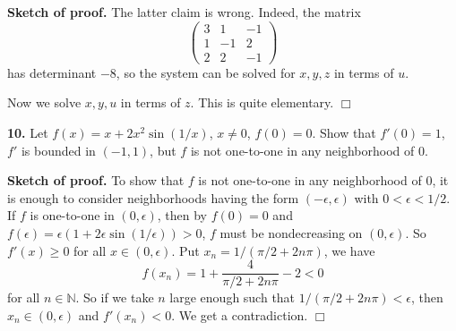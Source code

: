 \documentclass{article}
\begin{document}
    \textbf{Sketch of proof.} The latter claim is wrong. Indeed, the matrix
\[\begin{pmatrix}
3 & 1 & -1\\
1 & -1 & 2 \\
2 & 2 & -1
\end{pmatrix}\] has determinant $-8$, so the system can be solved for
$x,y,z$ in terms of $u$.

Now we solve $x,y,u$ in terms of $z$. This is quite elementary. $\Box$

    \textbf{10.} Let $f(x) = x+2x^2\sin(1/x)$, $x\ne 0$, $f(0) = 0$. Show
that $f'(0) = 1$, $f'$ is bounded in $(-1,1)$, but $f$ is not one-to-one
in any neighborhood of $0$.

    \textbf{Sketch of proof.} To show that $f$ is not one-to-one in any
neighborhood of $0$, it is enough to consider neighborhoods having the
form $(-\epsilon,\epsilon)$ with $0 < \epsilon < 1/2$. If $f$ is
one-to-one in $(0,\epsilon)$, then by $f(0) = 0$ and
$f(\epsilon) = \epsilon(1 + 2\epsilon \sin(1/\epsilon)) > 0$, $f$ must
be nondecreasing on $(0, \epsilon)$. So $f'(x) \ge 0$ for all
$x\in (0,\epsilon)$. Put $x_n =1/( \pi/2 + 2n \pi)$, we have
\[f(x_n) = 1 + \frac{4}{\pi/2 + 2n\pi} -2 < 0\] for all
$n\in \mathbb{N}$. So if we take $n$ large enough such that
$1/( \pi/2 + 2n \pi)< \epsilon$, then $x_n \in (0,\epsilon)$ and
$f'(x_n) < 0$. We get a contradiction. $\Box$


    
    
    
    
\end{document}
